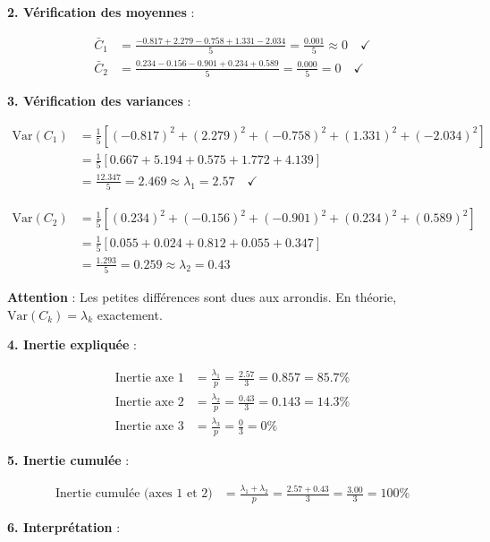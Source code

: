 \documentclass[11pt,a4paper]{article}
\newcommand{\Var}{\text{Var}}
\begin{document}
\textbf{2. Vérification des moyennes} :

\begin{align*}
\bar{C}_1 &= \frac{-0.817 + 2.279 - 0.758 + 1.331 - 2.034}{5} = \frac{0.001}{5} \approx 0 \quad \checkmark \\
\bar{C}_2 &= \frac{0.234 - 0.156 - 0.901 + 0.234 + 0.589}{5} = \frac{0.000}{5} = 0 \quad \checkmark
\end{align*}

\textbf{3. Vérification des variances} :

\begin{align*}
\Var(C_1) &= \frac{1}{5}[(-0.817)^2 + (2.279)^2 + (-0.758)^2 + (1.331)^2 + (-2.034)^2] \\
&= \frac{1}{5}[0.667 + 5.194 + 0.575 + 1.772 + 4.139] \\
&= \frac{12.347}{5} = 2.469 \approx \lambda_1 = 2.57 \quad \checkmark
\end{align*}

\begin{align*}
\Var(C_2) &= \frac{1}{5}[(0.234)^2 + (-0.156)^2 + (-0.901)^2 + (0.234)^2 + (0.589)^2] \\
&= \frac{1}{5}[0.055 + 0.024 + 0.812 + 0.055 + 0.347] \\
&= \frac{1.293}{5} = 0.259 \approx \lambda_2 = 0.43
\end{align*}

\begin{attentionbox}
\textbf{Attention} : Les petites différences sont dues aux arrondis. En théorie, $\Var(C_k) = \lambda_k$ exactement.
\end{attentionbox}

\textbf{4. Inertie expliquée} :

\begin{align*}
\text{Inertie axe 1} &= \frac{\lambda_1}{p} = \frac{2.57}{3} = 0.857 = 85.7\% \\
\text{Inertie axe 2} &= \frac{\lambda_2}{p} = \frac{0.43}{3} = 0.143 = 14.3\% \\
\text{Inertie axe 3} &= \frac{\lambda_3}{p} = \frac{0}{3} = 0\%
\end{align*}

\textbf{5. Inertie cumulée} :

\begin{align*}
\text{Inertie cumulée (axes 1 et 2)} &= \frac{\lambda_1 + \lambda_2}{p} = \frac{2.57 + 0.43}{3} = \frac{3.00}{3} = 100\%
\end{align*}

\textbf{6. Interprétation} :
\end{document}
